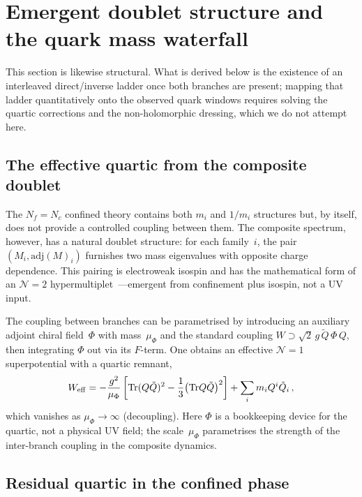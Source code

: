\documentclass[11pt,a4paper]{article}
\newcommand{\Nf}{N_f}
\newcommand{\Nc}{N_c}
\newcommand{\Tr}{\mathrm{Tr}}
\newcommand{\adj}{\mathrm{adj}}
\begin{document}
\section{Emergent doublet structure and the quark mass waterfall}
\label{sec:waterfall}

This section is likewise structural.  What is derived below is the existence of
an interleaved direct/inverse ladder once both branches are present; mapping
that ladder quantitatively onto the observed quark windows requires solving the
quartic corrections and the non-holomorphic dressing, which we do not attempt
here.

\subsection{The effective quartic from the composite doublet}
\label{sec:N2_descent}

The $\Nf=\Nc$ confined theory contains both $m_i$ and $1/m_i$
structures but, by itself, does not provide a controlled coupling between
them.  The composite spectrum, however, has a natural doublet structure:
for each family~$i$, the pair $(M_i, \adj(M)_i)$ furnishes two mass
eigenvalues with opposite charge dependence.  This pairing is electroweak
isospin and has the mathematical form of an $\mathcal{N}{=}2$
hypermultiplet~\cite{APS:1997,SeibergWitten:1994a}---emergent from
confinement plus isospin, not a UV input.

The coupling between branches can be parametrised by introducing an
auxiliary adjoint chiral field~$\Phi$ with mass~$\mu_\Phi$ and the
standard coupling $W \supset \sqrt2\,g\,\tilde Q\,\Phi\,Q$, then
integrating $\Phi$ out via its $F$-term.
One obtains an effective $\mathcal{N}{=}1$ superpotential with a quartic remnant,
\begin{equation}
  W_{\rm eff}
  = -\frac{g^2}{\mu_\Phi}\left[\Tr(Q\tilde Q)^2-\frac{1}{3}\bigl(\Tr Q\tilde Q\bigr)^2\right]
  + \sum_i m_i Q^i\tilde Q_i\,,
  \label{eq:Weff}
\end{equation}
which vanishes as $\mu_\Phi\to\infty$ (decoupling).
Here $\Phi$ is a bookkeeping device for the quartic, not a physical UV
field; the scale~$\mu_\Phi$ parametrises the strength of the inter-branch
coupling in the composite dynamics.

\subsection{Residual quartic in the confined phase}
\label{sec:quartic}
\end{document}
